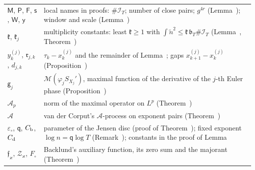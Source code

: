 \documentclass[preprint,12pt]{elsarticle}
\makeatletter
\let\CG@origref\ref
\newcommand{\CG@gettip}[1]{\@ifundefined{CGTip@#1}{Reference: #1}{\csname CGTip@#1\endcsname}}
\DeclareRobustCommand{\CGref}[1]{\pdftooltip{\CG@origref{#1}}{\CG@gettip{#1}}}
\numberwithin{equation}{section}
\theoremstyle{plain}
\theoremstyle{definition}
\theoremstyle{remark}
\newcommand{\IT}{\mathcal I_T}
\makeatother
\begin{document}
\begin{center}
\begin{longtable}{p{}p{}}
$\mathsf M$, $\mathsf P$, $\mathsf F$, $\mathsf s$, $\mathsf W$, $\mathsf y$ & local names in proofs: $\#\IT$; number of close pairs; $g^{4r}$ (Lemma~\CGref{lem:sampling_rho}); window and scale (Lemma~\CGref{lem:maximal_primes})\\
$\mathfrak k$, $\mathfrak k_j$ & multiplicity constants: least $\mathfrak k\ge1$ with $\int\tilde n^2\le\mathfrak k\,\mathfrak b_T\#\IT$ (Lemma~\CGref{lem:sampling_rho}, Theorem~\CGref{thm:uniform_iteration})\\
$y^{(j)}_k$, $\mathfrak r_{j,k}$, $d_{j,k}$ & $\tau_k-x^{(j)}_k$ and the remainder of Lemma~\CGref{lem:second_identity}; gaps $x^{(j)}_{k+1}-x^{(j)}_k$ (Proposition~\CGref{prop:deformation})\\
$\mathsf g_j$ & $\mathcal M(\varphi_jS_{X_j}')$, maximal function of the derivative of the $j$-th Euler phase (Proposition~\CGref{prop:recursion})\\
$\mathcal A_p$ & norm of the maximal operator on $L^p$ (Theorem~\CGref{thm:known_maximal})\\
$\mathscr A$ & van der Corput\textquoteright s $\mathscr A$-process on exponent pairs (Theorem~\CGref{thm:known_exponents})\\
$\varepsilon_\circ$, $\mathsf q$, $C_{\rm b}$, $C_{\rm d}$ & parameter of the Jensen disc (proof of Theorem~\CGref{thm:envelope}); fixed exponent $\log n=\mathsf q\log T$ (Remark~\CGref{rem:transport}); constants in the proof of Lemma~\CGref{lem:higher_moments}\\
$\mathfrak f_\varkappa$, $\mathcal Z_\varkappa$, $F_\circ$ & Backlund's auxiliary function, its zero sum and the majorant (Theorem~\CGref{thm:known_backlund})\\
\end{longtable}
\end{center}
\end{document}
